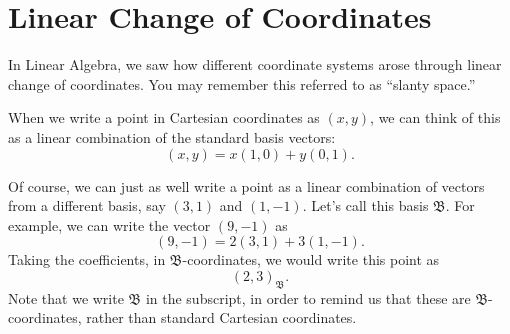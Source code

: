 \documentclass{ximera}
\begin{document}
\section*{Linear Change of Coordinates}

In Linear Algebra, we saw how different coordinate systems arose through linear change of coordinates. You may remember this referred to as ``slanty space.''

When we write a point in Cartesian coordinates as $(x,y)$, we can think of this as a linear combination of the standard basis vectors:
\[
(x,y) = x(1,0) + y(0,1).
\]

Of course, we can just as well write a point as a linear combination of vectors from a different basis, say $(3,1)$ and $(1, -1)$. Let's call this basis $\mathfrak{B}$. For example, we can write the vector $(9,-1)$ as
\[
(9,-1) = 2(3,1)+3(1,-1).
\]
Taking the coefficients, in $\mathfrak{B}$-coordinates, we would write this point as
\[
(2,3)_{\mathfrak{B}}.
\]
Note that we write $\mathfrak{B}$ in the subscript, in order to remind us that these are $\mathfrak{B}$-coordinates, rather than standard Cartesian coordinates.

\begin{image}
\end{image}
\end{document}
